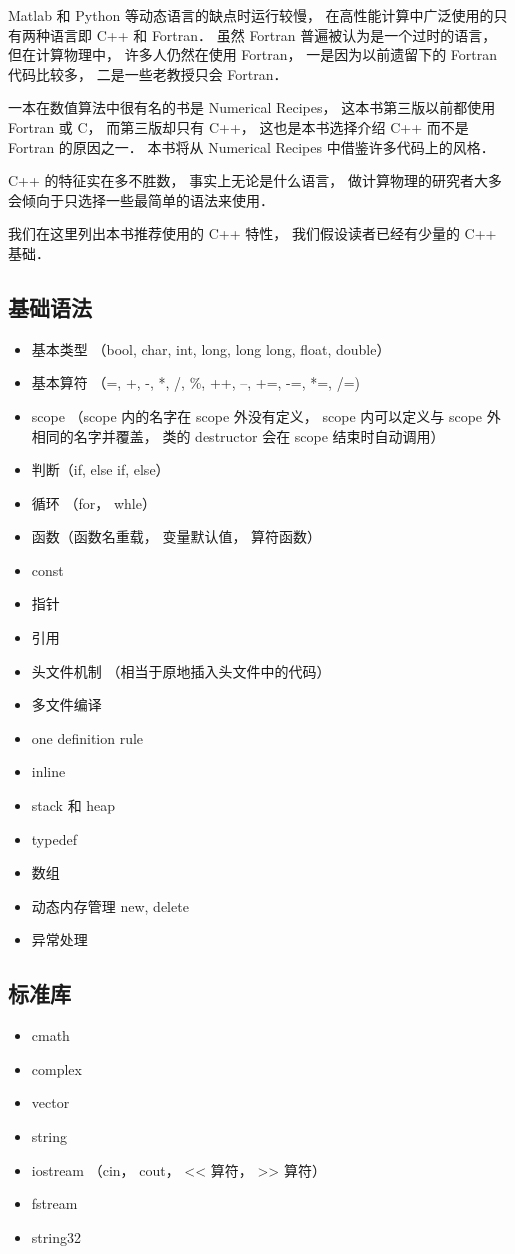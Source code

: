 
Matlab 和 Python 等动态语言的缺点时运行较慢， 在高性能计算中广泛使用的只有两种语言即 C++ 和 Fortran． 虽然 Fortran 普遍被认为是一个过时的语言， 但在计算物理中， 许多人仍然在使用 Fortran， 一是因为以前遗留下的 Fortran 代码比较多， 二是一些老教授只会 Fortran．

一本在数值算法中很有名的书是 Numerical Recipes， 这本书第三版以前都使用 Fortran 或 C， 而第三版却只有 C++， 这也是本书选择介绍 C++ 而不是 Fortran 的原因之一． 本书将从 Numerical Recipes 中借鉴许多代码上的风格．

C++ 的特征实在多不胜数， 事实上无论是什么语言， 做计算物理的研究者大多会倾向于只选择一些最简单的语法来使用．

我们在这里列出本书推荐使用的 C++ 特性， 我们假设读者已经有少量的 C++ 基础．

\subsection{基础语法}
\begin{itemize}
\item 基本类型 （bool, char, int, long, long long, float, double）
\item 基本算符 （=, +, -, *, /, \%, ++, --, +=, -=, *=, /=)
\item scope （scope 内的名字在 scope 外没有定义， scope 内可以定义与 scope 外相同的名字并覆盖， 类的 destructor 会在 scope 结束时自动调用）
\item 判断（if, else if, else）
\item 循环 （for， whle）
\item 函数（函数名重载， 变量默认值， 算符函数）
\item const
\item 指针
\item 引用
\item 头文件机制 （相当于原地插入头文件中的代码）
\item 多文件编译
\item one definition rule
\item inline
\item stack 和 heap
\item typedef
\item 数组
\item 动态内存管理 new, delete
\item 异常处理
\end{itemize}

\subsection{标准库}
\begin{itemize}
\item cmath
\item complex
\item vector
\item string
\item iostream （cin， cout， << 算符， >> 算符）
\item fstream
\item string32
\end{itemize}


